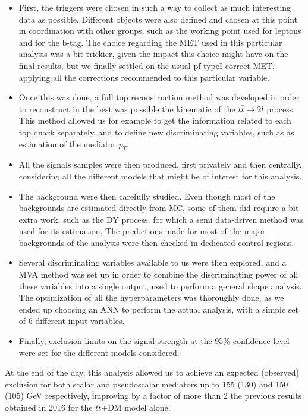 \documentclass[a4paper, 10pt, openright]{report}
\begin{document}
\begin{itemize}
\item First, the triggers were chosen in such a way to collect as much interesting data as possible. Different objects were also defined and chosen at this point in coordination with other groups, such as the working point used for leptons and for the b-tag. The choice regarding the \ac{MET} used in this particular analysis was a bit trickier, given the impact this choice might have on the final results, but we finally settled on the usual pf typeI correct \ac{MET}, applying all the corrections recommended to this particular variable.
\item Once this was done, a full top reconstruction method was developed in order to reconstruct in the best was possible the kinematic of the $t \bar t \rightarrow 2l$ process. This method allowed us for example to get the information related to each top quark separately, and to define new discriminating variables, such as as estimation of the mediator \bm $p_T$.
\item All the signals samples were then produced, first privately and then centrally, considering all the different models that might be of interest for this analysis.
\item The background were then carefully studied. Even though most of the backgrounds are estimated directly from \ac{MC}, some of them did require a bit extra work, such as the \ac{DY} process, for which a semi data-driven method was used for its estimation. The predictions made for most of the major backgrounds of the analysis were then checked in dedicated control regions.
\item Several discriminating variables available to us were then explored, and a MVA method was set up in order to combine the discriminating power of all these variables into a single output, used to perform a general shape analysis. The optimization of all the hyperparameters was thoroughly done, as we ended up choosing an \ac{ANN} to perform the actual analysis, with a simple set of 6 different input variables.
\item Finally, exclusion limits on the signal strength at the 95\% confidence level were set for the different models considered.
\end{itemize}

At the end of the day, this analysis allowed us to achieve an expected (observed) exclusion for both scalar and pseudoscalar mediators up to 155 (130) and 150 (105) GeV respectively, improving by a factor of more than 2 the previous results obtained in 2016 for the $t \bar t$+DM model alone.
\end{document}
